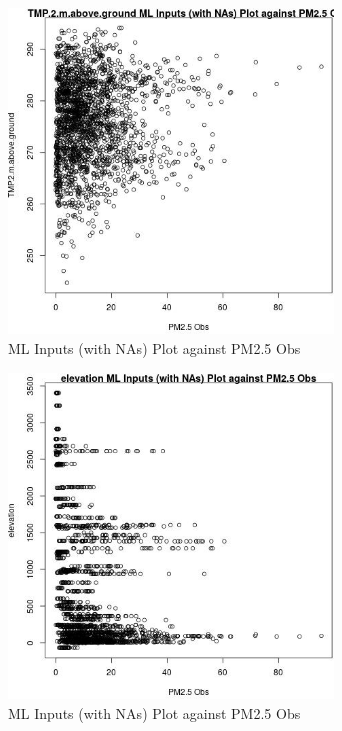 \begin{figure} 
\centering  
\includegraphics[width=0.77\textwidth]{Code_Outputs/Report_ML_input_PM25_Step4_part_e_de_duplicated_aveswNAs_TMP2mabovegroundvPM25_Obs.jpg} 
\caption{\label{fig:Report_ML_input_PM25_Step4_part_e_de_duplicated_aveswNAsTMP2mabovegroundvPM25_Obs}ML Inputs (with NAs) Plot against PM2.5 Obs} 
\end{figure} 
 

\begin{figure} 
\centering  
\includegraphics[width=0.77\textwidth]{Code_Outputs/Report_ML_input_PM25_Step4_part_e_de_duplicated_aveswNAs_elevationvPM25_Obs.jpg} 
\caption{\label{fig:Report_ML_input_PM25_Step4_part_e_de_duplicated_aveswNAselevationvPM25_Obs}ML Inputs (with NAs) Plot against PM2.5 Obs} 
\end{figure} 
 
